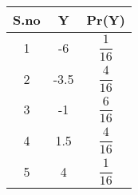 
\begin{tabular}{|c|c|c|}
\hline
S.no	&Y	&Pr(Y)\\
\hline
1	&-6	&$ \dfrac{1}{16}$\\\hline
2	&-3.5	&$ \dfrac{4}{16}$\\\hline
3	&-1	&$\dfrac{6}{16}$\\\hline
4	&1.5	&$\dfrac{4}{16}$\\\hline
5	&4	&$ \dfrac{1}{16}$\\
\hline
\end{tabular}
